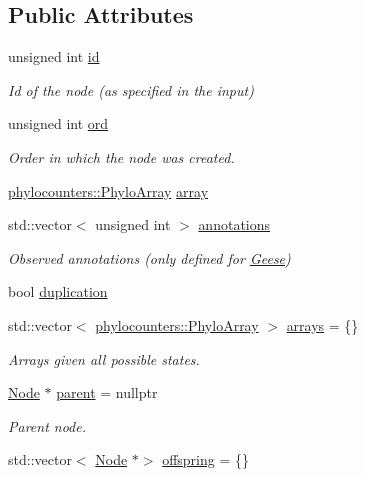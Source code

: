 \subsection*{Public Attributes}
\begin{DoxyCompactItemize}
\item 
unsigned int \hyperlink{class_node_adb90577d9d796c4ccbccf41ce2efc6c9}{id}
\begin{DoxyCompactList}\small\item\em Id of the node (as specified in the input) \end{DoxyCompactList}\item 
unsigned int \hyperlink{class_node_ac58501488a47ad56989463668d062e8f}{ord}
\begin{DoxyCompactList}\small\item\em Order in which the node was created. \end{DoxyCompactList}\item 
\hyperlink{namespacebarry_1_1counters_1_1phylo_abd293bf65e494e903639fb5fb2c91604}{phylocounters\+::\+Phylo\+Array} \hyperlink{class_node_a86d6575dd1ad7ab0cb02c6e6202b0608}{array}
\item 
std\+::vector$<$ unsigned int $>$ \hyperlink{class_node_aea43a76094980788d1debd3e18ed8070}{annotations}
\begin{DoxyCompactList}\small\item\em Observed annotations (only defined for \hyperlink{class_geese}{Geese}) \end{DoxyCompactList}\item 
bool \hyperlink{class_node_a3129939e8a58c055cb5ad8db8be6b10a}{duplication}
\item 
std\+::vector$<$ \hyperlink{namespacebarry_1_1counters_1_1phylo_abd293bf65e494e903639fb5fb2c91604}{phylocounters\+::\+Phylo\+Array} $>$ \hyperlink{class_node_a269d78db10090d106c697d7c73bac9c7}{arrays} = \{\}
\begin{DoxyCompactList}\small\item\em Arrays given all possible states. \end{DoxyCompactList}\item 
\hyperlink{class_node}{Node} $\ast$ \hyperlink{class_node_ad8184598cdea70e4bbdfd76f2b0f9e85}{parent} = nullptr
\begin{DoxyCompactList}\small\item\em Parent node. \end{DoxyCompactList}\item 
std\+::vector$<$ \hyperlink{class_node}{Node} $\ast$$>$ \hyperlink{class_node_a4e7e9c69da2575cad9c5fb7865dd42c7}{offspring} = \{\}
$$
\end{DoxyCompactItemize}
